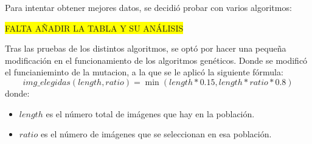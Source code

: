Para intentar obtener mejores datos, se decidió probar con varios algoritmos:


\colorbox{yellow}{FALTA AÑADIR LA TABLA Y SU ANÁLISIS}

Tras las pruebas de los distintos algoritmos, se optó por hacer una pequeña modificación en el funcionamiento de los
algoritmos genéticos.
Donde se modificó el funcianieminto de la mutacion, a la que se le aplicó la siguiente fórmula:
\[
img\_elegidas(length, ratio)=\min(length*0.15, length*ratio*0.8)
\]
donde:
\begin{itemize}
    \item $length$ es el número total de imágenes que hay en la población.
    \item $ratio$ es el número de imágenes que se seleccionan en esa población.
\end{itemize}

